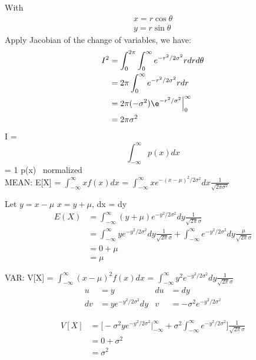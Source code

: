 \documentclass[12pt,letterpaper]{article}
\begin{document}
\begin{enumerate}
                With
                \begin{align*}
                    x = r\cos{\theta}\\
                    y = r\sin{\theta}
                \end{align*}
                Apply Jacobian of the change of variables, we have:
                \begin{equation*}
                    \begin{split}
                        I^2 &= \int_{0}^{2\pi}\int_{0}^{\infty}e^{-r^2/2\sigma ^2}rdrd\theta\\
                            &= 2\pi \int_{0}^{\infty}e^{-r^2/2\sigma ^2}rdr\\
                            &= 2\pi(-\sigma^2)\e^{-r^2/\sigma^2}\Big|_0^\infty\\
                            &= 2\pi\sigma^2
                    \end{split}
                \end{equation*}
                \Rightarrow I =  \Rightarrow \[\int_{-\infty}^{\infty} p(x)dx\] = 1 \Rightarrow p(x) \ normalized\\
                
                MEAN: E[X] = \(\int_{-\infty}^{\infty}xf(x)dx\) = \(\int_{-\infty}^{\infty}xe^{-(x-\mu)^2/2\sigma^2}dx\frac{1}{\sqrt{2\pi\sigma^2}}\)
        
                Let \(y = x - \mu\) \Rightarrow \(x = y + \mu\), dx = dy
                \begin{align*}
                    E(X) &= \int_{-\infty}^{\infty}(y + \mu)e^{-y^2/2\sigma^2}dy \frac{1}{\sqrt{2\pi}\sigma}\\ 
                         &= \int_{-\infty}^{\infty}ye^{-y^2/2\sigma^2}dy \frac{1}{\sqrt{2\pi}\sigma} + \int_{-\infty}^{\infty}e^{-y^2/2\sigma^2}dy \frac{\mu}{\sqrt{2\pi}\sigma}\\  &= 0 + \mu\\
                         &= \mu
                \end{align*}
                
                VAR: V[X] = \(\int_{-\infty}^{\infty}(x-\mu)^2f(x)dx\) = \(\int_{-\infty}^{\infty}y^2e^{-y^2/2\sigma^2}dy\frac{1}{\sqrt{2\pi}\sigma}\)
                \begin{align*}
                    u &= y  &  du &= dy \\
                   dv &= ye^{-y^2/2\sigma^2}dy & v &= -\sigma^2e^{-y^2/2\sigma^2}
                \end{align*}
                
                \begin{align*}
                    V[X] &= \Big[-\sigma^2ye^{-y^2/2\sigma^2}\big|_{-\infty}^\infty +\sigma^2\int_{-\infty}^{\infty}e^{-y^2/2\sigma^2}\Big]\frac{1}{\sqrt{2\pi}\sigma}\\
                         &= 0 + \sigma^2\\
                         &= \sigma^2
                \end{align*}
                
                
        \end{enumerate}
    
\end{document}
